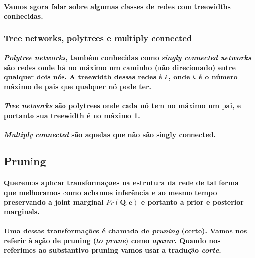 \documentclass[a4paper,10pt]{article}
\theoremstyle{plain}
\begin{document}
\paragraph{
  Vamos agora falar sobre algumas classes de redes com treewidths conhecidas.
}

\subsubsection{Tree networks, polytrees e multiply connected}

\paragraph{
  \textit{Polytree networks}, também conhecidas como \textit{singly connected networks} são redes
  onde há no máximo um caminho (não direcionado) entre qualquer dois nós. A treewidth dessas redes
  é $k$, onde $k$ é o número máximo de pais que qualquer nó pode ter.
}

\paragraph{
  \textit{Tree networks} são polytrees onde cada nó tem no máximo um pai, e portanto sua treewidth
  é no máximo 1.
}

\paragraph{
  \textit{Multiply connected} são aquelas que não são singly connected.
}

\subsection{Pruning}

\paragraph{
  Queremos aplicar transformações na estrutura da rede de tal forma que melhoramos como achamos
  inferência e ao mesmo tempo preservando a joint marginal $Pr(\textbf{Q}, \textbf{e})$ e portanto
  a prior e posterior marginals.
}

\paragraph{
  Uma dessas transformações é chamada de \textit{pruning} (corte). Vamos nos referir à ação de
  pruning (\textit{to prune}) como \textit{aparar}. Quando nos referimos ao substantivo pruning
  vamos usar a tradução \textit{corte}.
}
\end{document}
